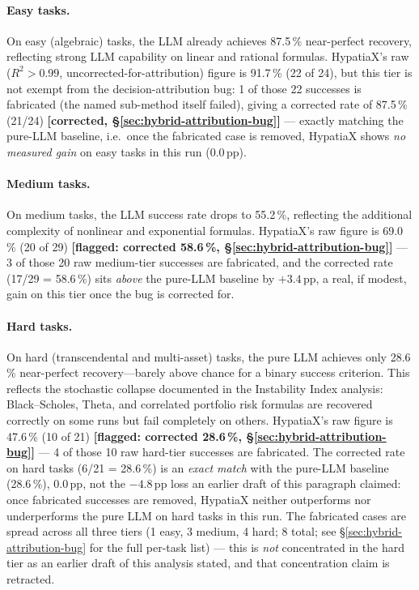\documentclass[twoside,11pt]{article}
\newcommand{\Rsq}{R^{2}}
\begin{document}
\paragraph{Easy tasks.}
On easy (algebraic) tasks, the LLM already achieves 87.5\,\% near-perfect recovery,
reflecting strong LLM capability on linear and rational formulas. HypatiaX's
raw ($\Rsq>0.99$, uncorrected-for-attribution) figure is 91.7\,\% (22 of 24),
but this tier is not exempt from the decision-attribution bug: 1 of those 22
successes is fabricated (the named sub-method itself failed), giving a
corrected rate of 87.5\,\% (21/24)
\textbf{[corrected, \S\ref{sec:hybrid-attribution-bug}]} --- exactly matching
the pure-LLM baseline, i.e.\ once the fabricated case is removed, HypatiaX shows
\emph{no measured gain} on easy tasks in this run ($0.0$\,pp).

\paragraph{Medium tasks.}
On medium tasks, the LLM success rate drops to 55.2\,\%, reflecting the additional
complexity of nonlinear and exponential formulas. HypatiaX's raw figure is 69.0\,\%
(20 of 29) \textbf{[flagged: corrected 58.6\,\%, \S\ref{sec:hybrid-attribution-bug}]}
--- 3 of those 20 raw medium-tier successes are fabricated, and the corrected
rate (17/29 = 58.6\,\%) sits \emph{above} the pure-LLM baseline by $+3.4$\,pp,
a real, if modest, gain on this tier once the bug is corrected for.

\paragraph{Hard tasks.}
On hard (transcendental and multi-asset) tasks, the pure LLM achieves only 28.6\,\%
near-perfect recovery---barely above chance for a binary success criterion. This
reflects the stochastic collapse documented in the Instability Index analysis:
Black--Scholes, Theta, and correlated portfolio risk formulas are recovered correctly
on some runs but fail completely on others. HypatiaX's raw figure is 47.6\,\%
(10 of 21) \textbf{[flagged: corrected 28.6\,\%, \S\ref{sec:hybrid-attribution-bug}]} ---
4 of those 10 raw hard-tier successes are fabricated. The corrected rate on hard
tasks (6/21 = 28.6\,\%) is an \emph{exact match} with the pure-LLM baseline
(28.6\,\%), $0.0$\,pp, not the $-4.8$\,pp loss an earlier draft of this paragraph
claimed: once fabricated successes are removed, HypatiaX neither outperforms nor
underperforms the pure LLM on hard tasks in this run.
The fabricated cases are spread across all three tiers (1 easy, 3 medium, 4 hard;
8 total; see \S\ref{sec:hybrid-attribution-bug} for the full per-task list) ---
this is \emph{not} concentrated in the hard tier as an earlier draft of this
analysis stated, and that concentration claim is retracted.
\end{document}
